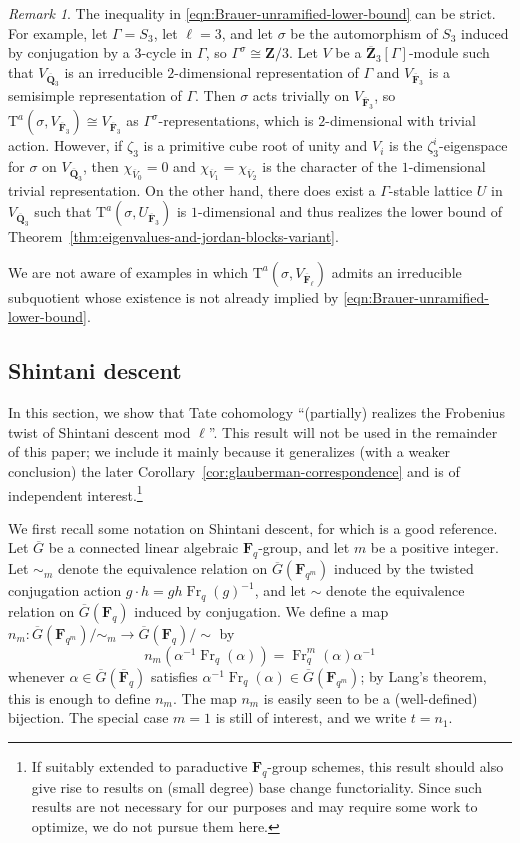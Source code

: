 \documentclass[reqno]{amsart}
\numberwithin{equation}{subsection}
\newcommand{\F}{\mathbf{F}}
\newcommand{\Q}{\mathbf{Q}}
\newcommand{\Z}{\mathbf{Z}}
\newcommand{\ol}[1]{\overline{#1}}
\newcommand{\co}{\colon}
\DeclareMathOperator{\Fr}{Fr}
\newcommand{\rT}{\ensuremath{\mathrm{T}}\xspace}
\theoremstyle{remark}
\newtheorem{remark}[thm]{Remark}
\numberwithin{equation}{subsection}
\numberwithin{figure}{subsection}
\begin{document}
\begin{remark}\label{remark:strict-inequality}
    The inequality in \eqref{eqn:Brauer-unramified-lower-bound} can be strict. For example, let $\Gamma = S_3$, let $\ell = 3$, and let $\sigma$ be the automorphism of $S_3$ induced by conjugation by a $3$-cycle in $\Gamma$, so $\Gamma^\sigma \cong \Z/3$. Let $V$ be a $\ol\Z_3[\Gamma]$-module such that $V_{\ol\Q_3}$ is an irreducible $2$-dimensional representation of $\Gamma$ and $V_{\ol\F_3}$ is a semisimple representation of $\Gamma$. Then $\sigma$ acts trivially on $V_{\ol\F_3}$, so $\rT^a(\sigma, V_{\ol\F_3}) \cong V_{\ol\F_3}$ as $\Gamma^\sigma$-representations, which is $2$-dimensional with trivial action. However, if $\zeta_3$ is a primitive cube root of unity and $V_i$ is the $\zeta_3^i$-eigenspace for $\sigma$ on $V_{\ol\Q_3}$, then $\chi_{\ol V_0} = 0$ and $\chi_{\ol V_1} = \chi_{\ol V_2}$ is the character of the $1$-dimensional trivial representation. On the other hand, there does exist a $\Gamma$-stable lattice $U$ in $V_{\ol\Q_3}$ such that $\rT^a(\sigma, U_{\ol\F_3})$ is $1$-dimensional and thus realizes the lower bound of Theorem~\ref{thm:eigenvalues-and-jordan-blocks-variant}.
    
    We are not aware of examples in which $\rT^a(\sigma, V_{\ol\F_\ell})$ admits an irreducible subquotient whose existence is not already implied by \eqref{eqn:Brauer-unramified-lower-bound}.
\end{remark}



\subsection{Shintani descent}\label{sss:shintani}
In this section, we show that Tate cohomology ``(partially) realizes the Frobenius twist of Shintani descent mod $\ell$''. This result will not be used in the remainder of this paper; we include it mainly because it generalizes (with a weaker conclusion) the later Corollary~\ref{cor:glauberman-correspondence} and is of independent interest.\footnote{If suitably extended to paraductive $\F_q$-group schemes, this result should also give rise to results on (small degree) base change functoriality. Since such results are not necessary for our purposes and may require some work to optimize, we do not pursue them here.}

We first recall some notation on Shintani descent, for which \cite{Kaw87} is a good reference. Let $\ol G$ be a connected linear algebraic $\F_q$-group, and let $m$ be a positive integer. Let $\sim_m$ denote the equivalence relation on $\ol G(\F_{q^m})$ induced by the twisted conjugation action $g \cdot h = gh\Fr_q(g)^{-1}$, and let $\sim$ denote the equivalence relation on $\ol G(\F_q)$ induced by conjugation. We define a map $n_m\co \ol G(\F_{q^m})/{\sim_m} \to \ol G(\F_q)/{\sim}$ by
\[
n_m(\alpha^{-1}\Fr_q(\alpha)) = \Fr_q^m(\alpha)\alpha^{-1}
\]
whenever $\alpha \in \ol G(\ol\F_q)$ satisfies $\alpha^{-1}\Fr_q(\alpha) \in \ol G(\F_{q^m})$; by Lang's theorem, this is enough to define $n_m$. The map $n_m$ is easily seen to be a (well-defined) bijection. The special case $m = 1$ is still of interest, and we write $t = n_1$.
\end{document}

